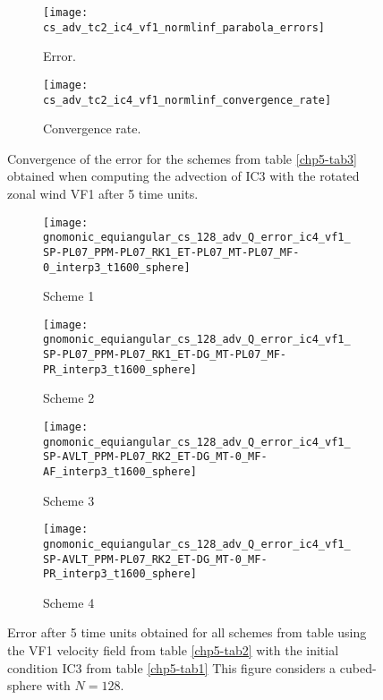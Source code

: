 \begin{figure}[!htb]
	\centering
	\begin{subfigure}{0.42\textwidth}
		\centering
		\texttt{[image: cs\_adv\_tc2\_ic4\_vf1\_normlinf\_parabola\_errors]}
		\caption{Error.\label{chp5-adv2-error}}
	\end{subfigure}
	\begin{subfigure}{0.42\textwidth}
		\centering
		\texttt{[image: cs\_adv\_tc2\_ic4\_vf1\_normlinf\_convergence\_rate]}
		\caption{Convergence rate.\label{chp5-adv2-cr}}
	\end{subfigure}
	\caption{Convergence of the error for the schemes from table \ref{chp5-tab3} obtained when computing the advection of IC3  with the rotated zonal wind VF1 after 5 time units.
	\label{chp5-error-adv2}}
\end{figure}


\begin{figure}[!htb]
	\centering
	\begin{subfigure}{0.3\textwidth}
		\centering
		\texttt{[image: gnomonic\_equiangular\_cs\_128\_adv\_Q\_error\_ic4\_vf1\_SP-PL07\_PPM-PL07\_RK1\_ET-PL07\_MT-PL07\_MF-0\_interp3\_t1600\_sphere]}
		\caption{Scheme 1 \label{chp5-adv2-s1}}
	\end{subfigure}
	\begin{subfigure}{0.3\textwidth}
		\centering
		\texttt{[image: gnomonic\_equiangular\_cs\_128\_adv\_Q\_error\_ic4\_vf1\_SP-PL07\_PPM-PL07\_RK1\_ET-DG\_MT-PL07\_MF-PR\_interp3\_t1600\_sphere]}
		\caption{Scheme 2 \label{chp5-adv2-s2}}
	\end{subfigure}

	\begin{subfigure}{0.3\textwidth}
		\centering
		\texttt{[image: gnomonic\_equiangular\_cs\_128\_adv\_Q\_error\_ic4\_vf1\_SP-AVLT\_PPM-PL07\_RK2\_ET-DG\_MT-0\_MF-AF\_interp3\_t1600\_sphere]}
		\caption{Scheme 3 \label{chp5-adv2-s3}}
	\end{subfigure}
	\begin{subfigure}{0.3\textwidth}
		\centering
		\texttt{[image: gnomonic\_equiangular\_cs\_128\_adv\_Q\_error\_ic4\_vf1\_SP-AVLT\_PPM-PL07\_RK2\_ET-DG\_MT-0\_MF-PR\_interp3\_t1600\_sphere]}
		\caption{Scheme 4 \label{chp5-adv2-s4}}
	\end{subfigure}
	\caption{ Error after 5 time units obtained for all schemes from table using the VF1 velocity field from table \ref{chp5-tab2} with the initial condition IC3 from  table \ref{chp5-tab1} 
		This figure considers a cubed-sphere with $N=128$. \label{chp5-adv2}}
\end{figure}


